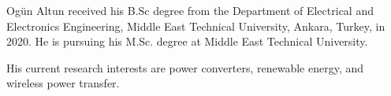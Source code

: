 \documentclass[journal]{IEEEtran}
\begin{document}
\begin{IEEEbiography}
{Ogün Altun} received his B.Sc degree from the Department of Electrical and Electronics Engineering, Middle East Technical University, Ankara, Turkey, in 2020. He is pursuing his M.Sc. degree at Middle East Technical University. 

His current research interests are power converters, renewable energy, and wireless power transfer.
\end{IEEEbiography}
\end{document}
